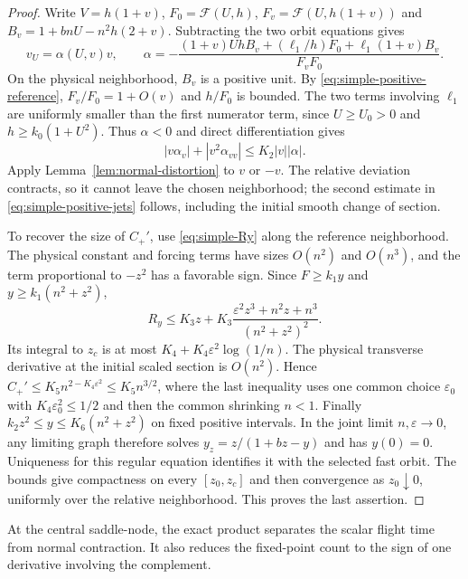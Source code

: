 \begin{proof}
Write $V=h(1+v)$, $F_0=\mathcal F(U,h)$,
$F_v=\mathcal F(U,h(1+v))$ and
$B_v=1+bnU-n^2h(2+v)$.  Subtracting the two orbit equations gives
\begin{equation}\label{eq:simple-relative-equation}
 v_U=\alpha(U,v)v,\qquad
 \alpha=-\frac{(1+v)UhB_v+(\ell_1/h)F_0
                      +\ell_1(1+v)B_v}{F_vF_0}.
\end{equation}
On the physical neighborhood, $B_v$ is a positive unit. By
\eqref{eq:simple-positive-reference}, $F_v/F_0=1+O(v)$ and
$h/F_0$ is bounded.  The two terms involving $\ell_1$ are uniformly
smaller than the first numerator term, since $U\ge U_0>0$ and
$h\ge k_0(1+U^2)$.  Thus $\alpha<0$ and direct differentiation gives
\[
 |v\alpha_v|+|v^2\alpha_{vv}|\le K_2|v||\alpha|.
\]
Apply Lemma~\ref{lem:normal-distortion} to $v$ or $-v$.
The relative deviation contracts, so it cannot leave the chosen
neighborhood; the second estimate in \eqref{eq:simple-positive-jets}
follows, including the initial smooth change of section.

To recover the size of $C_+'$, use \eqref{eq:simple-Ry} along the
reference neighborhood. The physical constant and forcing terms have
sizes $O(n^2)$ and $O(n^3)$, and the term proportional to $-z^2$ has
a favorable sign.  Since $F\ge k_1y$ and $y\ge k_1(n^2+z^2)$,
\[
 R_y\le K_3z+
 K_3\frac{\varepsilon^2z^3+n^2z+n^3}{(n^2+z^2)^2}.
\]
Its integral to $z_c$ is at most
$K_4+K_4\varepsilon^2\log(1/n)$.  The physical transverse derivative
at the initial scaled section is $O(n^2)$.  Hence
$C_+'\le K_5n^{2-K_4\varepsilon^2}\le K_5n^{3/2}$, where the last
inequality uses one common choice $\varepsilon_0$ with
$K_4\varepsilon_0^2\le1/2$ and then the common shrinking $n<1$.
Finally $k_2z^2\le y\le K_6(n^2+z^2)$ on fixed positive intervals.
In the joint limit $n,\varepsilon\to0$, any limiting graph therefore solves
$y_z=z/(1+bz-y)$ and has $y(0)=0$.
Uniqueness for this regular equation identifies it with the selected
fast orbit.  The bounds give compactness on every $[z_0,z_c]$ and then
convergence as $z_0\downarrow0$, uniformly over the relative
neighborhood.  This proves the last assertion.
\end{proof}

At the central saddle-node, the exact product separates the scalar
flight time from normal contraction. It also reduces the fixed-point
count to the sign of one derivative involving the complement.


